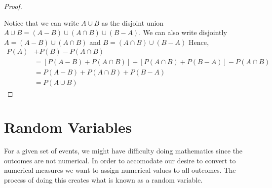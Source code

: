 \documentclass[10pt,]{book}
\theoremstyle{plain}
\theoremstyle{definition}
\theoremstyle{definition}
\numberwithin{equation}{section}
\begin{document}
\begin{proof}\hypertarget{proof-8}{}
Notice that we can write \(A \cup B\) as the disjoint union
			\(A \cup B = (A-B) \cup (A \cap B) \cup (B-A)\). We can also write disjointly
			\(A = (A-B) \cup (A \cap B)\) and \(B = (A \cap B) \cup (B-A)\)
			Hence, %
\begin{align*}
P(A) & + P(B) - P(A \cap B) \\
& = [P(A-B) + P(A \cap B)] + [P(A \cap B) + P(B-A)] - P(A \cap B)\\
& = P(A-B) + P(A \cap B) + P(B-A)\\
& = P(A \cup B)
\end{align*}\end{proof}
\typeout{************************************************}
\typeout{************************************************}
\section[Random Variables]{Random Variables}\label{section-6}
For a given set of events, we might have difficulty doing mathematics since the outcomes
are not numerical. In order to accomodate our desire to convert to numerical measures we want
to assign numerical values to all outcomes. The process of doing this creates what is known as a random
variable.
%
\typeout{************************************************}
\typeout{************************************************}
\end{document}
